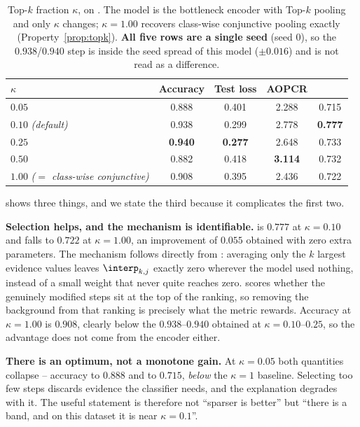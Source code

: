 \begin{table}[t]
\caption{Top-$k$ fraction $\kappa$, on \webtraffic{}. The model is the \seanet{} bottleneck encoder
with Top-$k$ pooling and only $\kappa$ changes; $\kappa = 1.00$ recovers class-wise conjunctive
pooling exactly (Property~\ref{prop:topk}). \textbf{All five rows are a single seed} (seed $0$), so
the $0.938$/$0.940$ step is inside the seed spread of this model ($\pm 0.016$) and is not read as a
difference.}
\label{tab:kappa}
\begin{center}
\small
\begin{tabular}{lcccc}
\toprule
\textbf{$\kappa$} & \textbf{Accuracy} & \textbf{Test loss} & \textbf{AOPCR} & \textbf{\ndcg{}} \\
\midrule
$0.05$                       & 0.888 & 0.401 & 2.288 & 0.715 \\
$0.10$ \emph{(default)}      & 0.938 & 0.299 & 2.778 & \textbf{0.777} \\
$0.25$                       & \textbf{0.940} & \textbf{0.277} & 2.648 & 0.733 \\
$0.50$                       & 0.882 & 0.418 & \textbf{3.114} & 0.732 \\
$1.00$ \emph{($=$ class-wise conjunctive)} & 0.908 & 0.395 & 2.436 & 0.722 \\
\bottomrule
\end{tabular}
\end{center}
\end{table}

 shows three things, and we state the third because it complicates the first two.

\textbf{Selection helps, and the mechanism is identifiable.} \ndcg{} is $0.777$ at $\kappa = 0.10$
and falls to $0.722$ at $\kappa = 1.00$, an improvement of $0.055$ obtained with zero extra
parameters. The mechanism follows directly from : averaging only the $k$ largest
evidence values leaves $\interp_{k,j}$ exactly zero wherever the model used nothing, instead of a
small weight that never quite reaches zero. \ndcg{} scores whether the genuinely modified steps sit
at the top of the ranking, so removing the background from that ranking is precisely what the metric
rewards. Accuracy at $\kappa = 1.00$ is $0.908$, clearly below the $0.938$--$0.940$ obtained at
$\kappa = 0.10$--$0.25$, so the advantage does not come from the encoder either.

\textbf{There is an optimum, not a monotone gain.} At $\kappa = 0.05$ both quantities collapse --
accuracy to $0.888$ and \ndcg{} to $0.715$, \emph{below} the $\kappa = 1$ baseline. Selecting too few
steps discards evidence the classifier needs, and the explanation degrades with it. The useful
statement is therefore not ``sparser is better'' but ``there is a band, and on this dataset it is
near $\kappa = 0.1$''.

